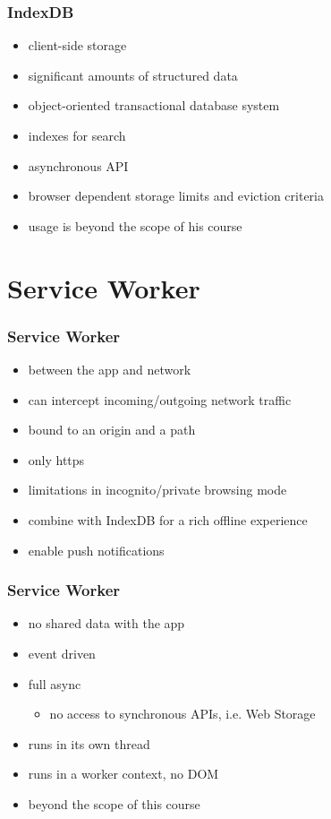 \begin{frame}[fragile]\frametitle{IndexDB}
\color{structure}
\begin{itemize}\color{structure}
  \item client-side storage
  \item significant amounts of structured data
  \item object-oriented transactional database system
  \item indexes for search
  \item asynchronous API
  \item browser dependent storage limits and eviction criteria
  \item usage is beyond the scope of his course
\end{itemize}
\end{frame}

\section{Service Worker}
\begin{frame}[fragile]\frametitle{Service Worker}
\color{structure}
\begin{itemize}\color{structure}
  \item between the app and network
  \item can intercept incoming/outgoing network traffic
  \item bound to an origin and a path
  \item only https
  \item limitations in incognito/private browsing mode
  \item combine with IndexDB for a rich offline experience
  \item enable push notifications
\end{itemize}
\end{frame}

\begin{frame}[fragile]\frametitle{Service Worker}
\begin{itemize}\color{structure}
  \item no shared data with the app
  \item event driven
  \item full async
  \begin{itemize}
    \item no access to synchronous APIs, i.e. Web Storage
  \end{itemize}
  \item runs in its own thread
  \item runs in a worker context, no DOM
  \item beyond the scope of this course
\end{itemize}
\end{frame}
